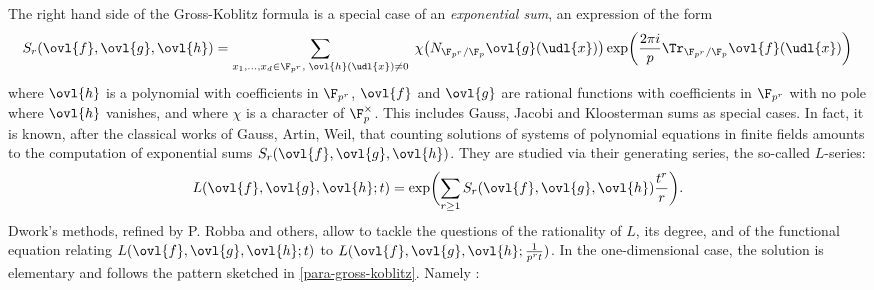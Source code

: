 \begin{para}
 The right hand side of the Gross-Koblitz formula is a special case of an
 {\it exponential sum}, \ie an expression of the form
 \begin{equation*}
  S_r(\ovl{f},\ovl{g},\ovl{h})
   = \sum_{x_1,\ldots,x_d \in \F_{p^r},\;
   \ovl{h}(\udl{x})\neq 0}\;\chi\bigl(N_{\F_{p^r}/\F_{p}}
   \ovl{g}(\udl{x})\bigr)\exp\biggl(\frac{2\pi i}{p}
   \Tr_{\F_{p^r}/\F_{p}}\ovl{f}(\udl{x})\biggr) 
 \end{equation*}
 where $\ovl{h}$ is a polynomial with coefficients in
 $\F_{p^r}$, $\ovl{f}$ and $\ovl{g}$ are rational functions with
 coefficients in $\F_{p^r}$ with no pole where $\ovl{h}$
 vanishes, and where $\chi$ is a character of
 $\F_{p}^{\times}$.  This includes Gauss, Jacobi and Kloosterman
 sums as special cases.  In fact, it is known, after the classical works
 of Gauss, Artin, Weil, that counting solutions of systems of polynomial 
 equations in finite fields amounts to the computation of exponential
 sums $S_r(\ovl{f},\ovl{g},\ovl{h})$.  They are studied via their
 generating series, the so-called $L$-series:
 \begin{equation*}
  L(\ovl{f},\ovl{g},\ovl{h};t)=
   \exp\biggl(\sum_{r\geq 1}S_r(\ovl{f},\ovl{g},\ovl{h})\frac{t^r}{r}\biggr).
 \end{equation*}
 Dwork's methods, refined by P. Robba and others, allow to tackle the
 questions of the rationality of $L$, its degree, and of the functional
 equation relating $L(\ovl{f},\ovl{g},\ovl{h};t)$ to
 $L(\ovl{f},\ovl{g},\ovl{h};\frac{1}{p^rt})$.
 In the one-dimensional case, the solution is elementary and follows the
 pattern sketched in \ref{para-gross-koblitz}. Namely \cite{edpaase}:
\end{para}
